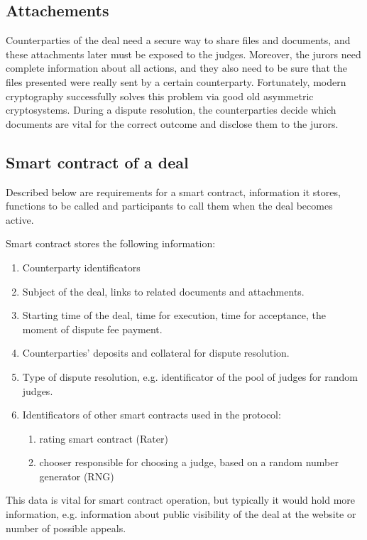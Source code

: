 \documentclass[12pt]{article}
\begin{document}
\subsection{Attachements}
Counterparties of the deal need a secure way to share files and documents, and these attachments later must be exposed to the judges.
Moreover, the jurors need complete information about all actions, and they also need to be sure that the files presented were really sent by
a certain counterparty. Fortunately, modern cryptography successfully solves this problem via good old asymmetric cryptosystems. During a
dispute resolution, the counterparties decide which documents are vital for the correct outcome and disclose them to the jurors.
\subsection{Smart contract of a deal}
Described below are requirements for a smart contract, information it stores, functions to be called and participants to call them when the
deal becomes active.

Smart contract stores the following information:
\begin{enumerate}
		\item Counterparty identificators
		\item Subject of the deal, links to related documents and attachments.
		\item Starting time of the deal, time for execution, time for acceptance, the moment of dispute fee payment.
		\item Counterparties’ deposits and collateral for dispute resolution.
		\item Type of dispute resolution, e.g. identificator of the pool of judges for random judges.
		\item Identificators of other smart contracts used in the protocol:
				\begin{enumerate}
						\item rating smart contract (Rater)
						\item chooser responsible for choosing a judge, based on a random number generator (RNG)
				\end{enumerate}
\end{enumerate}

This data is vital for smart contract operation, but typically it would hold more information, e.g. information about public visibility of
the deal at the website or number of possible appeals.
\end{document}
